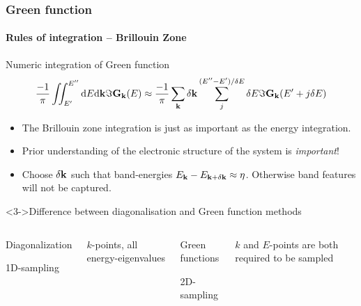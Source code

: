 \begin{frame}
  \frametitle{Green function}
  \framesubtitle{Rules of integration -- Brillouin Zone}


  \begin{block}{Numeric integration of Green function}
    \small 
    \begin{equation*}
      \frac{-1}\pi\iint_{E'}^{E''} \mathrm{d} E\mathrm{d} \mathbf{k}\Im \mathbf{G}_{\mathbf{k}}(E) \approx \frac{-1}\pi
      \sum_{\mathbf{k}}\delta\mathbf{k}\sum_j^{(E''-E')/\delta E} \delta E \Im \mathbf{G}_{\mathbf{k}}(E'+j\delta E)
    \end{equation*}

    \begin{itemize}
      \item%
      The Brillouin zone integration is just as important as the energy integration.

      \item%
      Prior understanding of the electronic structure of the system is \emph{important}! 

      \item<2->%
      Choose $\delta\mathbf{k}$ such that band-energies $E_{\mathbf{k}} -
      E_{\mathbf{k}+\delta\mathbf{k}}\approx \eta$. Otherwise band features will not be captured.
      
    \end{itemize}

  \end{block}

  \begin{block}<3->{Difference between diagonalisation and Green function methods}

    \begin{columns}[t]

      \begin{center}
        Diagonalization

        \Large 1D-sampling
      \end{center}

      $k$-points, all energy-eigenvalues


      \begin{center}
        Green functions

        \Large 2D-sampling
      \end{center}

      $k$ and $E$-points are both required to be sampled

    \end{columns}
    
  \end{block}

\end{frame}


